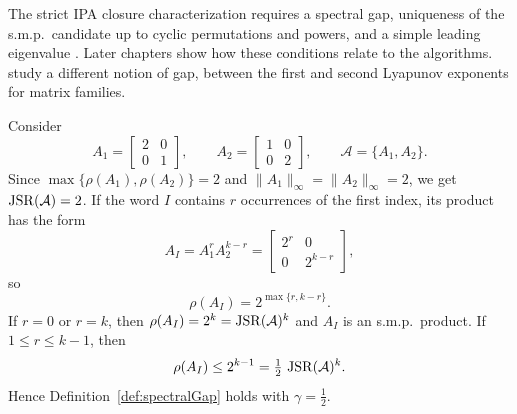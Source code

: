 \begin{remark}
    \label{rem:spectralGapHybrid}
    The strict IPA closure characterization requires a spectral gap, uniqueness of the s.m.p.\ candidate up to cyclic permutations and powers, and a simple leading eigenvalue \citep{MejstrikReif2025HybridApproachJSR}.
    Later chapters show how these conditions relate to the algorithms.
    \citet{GuglielmiProtasov2024SpectralGapFamilyMatrices} study a different notion of gap, between the first and second Lyapunov exponents for matrix families.
\end{remark}

\begin{example}
    \label{ex:spectralGap}
    Consider
    \[
        A_1=\begin{bmatrix}2&0\\0&1\end{bmatrix},
        \qquad
        A_2=\begin{bmatrix}1&0\\0&2\end{bmatrix},
        \qquad
        \mathcal{A}=\{A_1,A_2\}.
    \]
    Since $\max\{\rho(A_1),\rho(A_2)\}=2$ and $\lVert A_1\rVert _\infty=\lVert A_2\rVert _\infty=2$, we get $\operatorname{JSR}(\mathcal{A})=2$.
    If the word $I$ contains $r$ occurrences of the first index, its product has the form
    \[
        A_I = A_1^r A_2^{k-r}
        = \begin{bmatrix}2^r&0\\0&2^{k-r}\end{bmatrix},
    \]
    so
    \[
        \rho(A_I)=2^{\max\{r,k-r\}}.
    \]
    If $r=0$ or $r=k$, then $\rho(A_I)=2^k=\operatorname{JSR}(\mathcal{A})^k$ and $A_I$ is an s.m.p.\ product.
    If $1\leq r\leq k-1$, then
    \[
        \rho(A_I)\leq 2^{k-1}=\tfrac12\,\operatorname{JSR}(\mathcal{A})^k.
    \]
    Hence Definition~\ref{def:spectralGap} holds with $\gamma=\tfrac12$.
\end{example}

